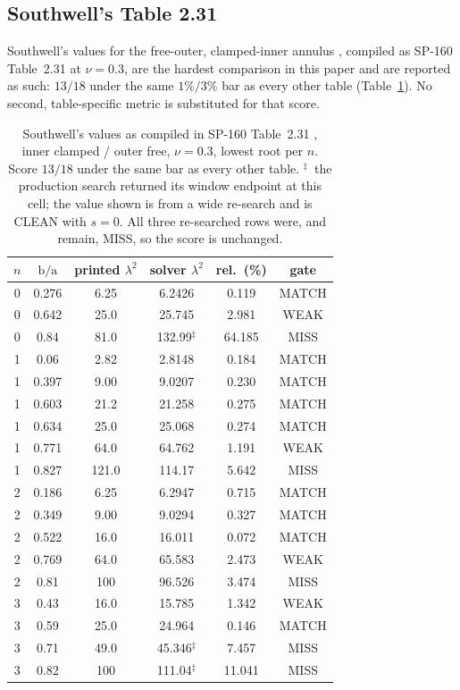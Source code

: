 \documentclass[11pt]{article}
\newcommand{\lamsq}{\lambda^{2}}
\newcommand{\ba}{\mbox{b/a}}
\begin{document}
\FloatBarrier
\subsection{Southwell's Table 2.31}\label{sec:southwell}
Southwell's values for the free-outer, clamped-inner annulus
\cite{southwell}, compiled as SP-160 Table~2.31 at $\nu=0.3$, are the hardest
comparison in this paper and are reported as such:
\textbf{$13/18$} under the same $1\%/3\%$ bar as every other table
(Table~\ref{tab:southwell}). No second, table-specific metric is substituted
for that score.

\begin{table}[htbp]\centering\small
\caption{Southwell's values \cite{southwell} as compiled in SP-160
Table~2.31 \cite{leissaSP160}, inner clamped / outer free, $\nu=0.3$, lowest
root per $n$. Score $13/18$ under the same bar as every other table.
$^{\ddagger}$~the production search returned its window endpoint at this cell;
the value shown is from a wide re-search and is CLEAN with $s=0$. All three
re-searched rows were, and remain, MISS, so the score is unchanged.}
\label{tab:southwell}
\begin{tabular}{cccccc}
\toprule
$n$ & $\ba$ & printed $\lamsq$ & solver $\lamsq$ & rel.\ (\%) & gate\\
\midrule
0 & 0.276 & 6.25 & 6.2426 & 0.119 & MATCH \\
0 & 0.642 & 25.0 & 25.745 & 2.981 & WEAK \\
0 & 0.84 & 81.0 & 132.99$^{\ddagger}$ & 64.185 & MISS \\
1 & 0.06 & 2.82 & 2.8148 & 0.184 & MATCH \\
1 & 0.397 & 9.00 & 9.0207 & 0.230 & MATCH \\
1 & 0.603 & 21.2 & 21.258 & 0.275 & MATCH \\
1 & 0.634 & 25.0 & 25.068 & 0.274 & MATCH \\
1 & 0.771 & 64.0 & 64.762 & 1.191 & WEAK \\
1 & 0.827 & 121.0 & 114.17 & 5.642 & MISS \\
2 & 0.186 & 6.25 & 6.2947 & 0.715 & MATCH \\
2 & 0.349 & 9.00 & 9.0294 & 0.327 & MATCH \\
2 & 0.522 & 16.0 & 16.011 & 0.072 & MATCH \\
2 & 0.769 & 64.0 & 65.583 & 2.473 & WEAK \\
2 & 0.81 & 100 & 96.526 & 3.474 & MISS \\
3 & 0.43 & 16.0 & 15.785 & 1.342 & WEAK \\
3 & 0.59 & 25.0 & 24.964 & 0.146 & MATCH \\
3 & 0.71 & 49.0 & 45.346$^{\ddagger}$ & 7.457 & MISS \\
3 & 0.82 & 100 & 111.04$^{\ddagger}$ & 11.041 & MISS \\
\bottomrule
\end{tabular}
\end{table}
\end{document}
